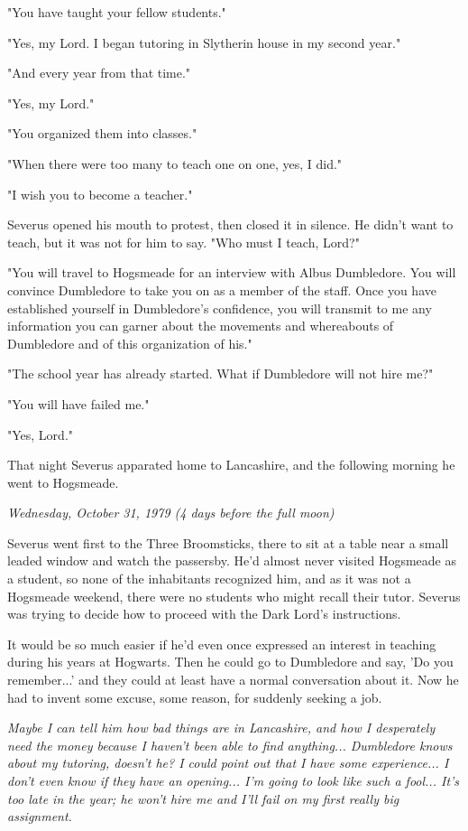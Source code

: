 \documentclass[a4paper,11pt]{article}
\begin{document}
"You have taught your fellow students."

"Yes, my Lord. I began tutoring in Slytherin house in my second year."

"And every year from that time."

"Yes, my Lord."

"You organized them into classes."

"When there were too many to teach one on one, yes, I did."

"I wish you to become a teacher."

Severus opened his mouth to protest, then closed it in silence. He didn't want to teach, but it was not for him to say. "Who must I teach, Lord?"

"You will travel to Hogsmeade for an interview with Albus Dumbledore. You will convince Dumbledore to take you on as a member of the staff. Once you have established yourself in Dumbledore's confidence, you will transmit to me any information you can garner about the movements and whereabouts of Dumbledore and of this organization of his."

"The school year has already started. What if Dumbledore will not hire me?"

"You will have failed me."

"Yes, Lord."

That night Severus apparated home to Lancashire, and the following morning he went to Hogsmeade.

\emph{Wednesday, October 31, 1979 (4 days before the full moon)}

Severus went first to the Three Broomsticks, there to sit at a table near a small leaded window and watch the passersby. He'd almost never visited Hogsmeade as a student, so none of the inhabitants recognized him, and as it was not a Hogsmeade weekend, there were no students who might recall their tutor. Severus was trying to decide how to proceed with the Dark Lord's instructions.

It would be so much easier if he'd even once expressed an interest in teaching during his years at Hogwarts. Then he could go to Dumbledore and say, 'Do you remember...' and they could at least have a normal conversation about it. Now he had to invent some excuse, some reason, for suddenly seeking a job.

\emph{Maybe I can tell him how bad things are in Lancashire, and how I desperately need the money because I haven't been able to find anything... Dumbledore knows about my tutoring, doesn't he? I could point out that I have some experience... I don't even know if they have an opening... I'm going to look like such a fool... It's too late in the year; he won't hire me and I'll fail on my first really big assignment.}
\end{document}
